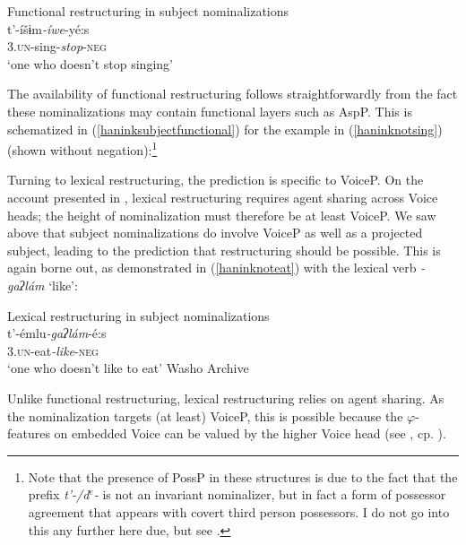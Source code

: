 \documentclass[output=paper]{langscibook}
\begin{document}
\ea Functional restructuring in subject nominalizations\\
{\gll t'-íšɨm\textit{-íwe}-yé:s\\
{\scshape 3.un}-sing-\textit{stop}-{\scshape neg}\\
\glt `one who doesn't stop singing'} \label{haninknotsing}
\z

The availability of functional restructuring follows straightforwardly from the fact these nominalizations may contain functional layers such as AspP. This is schematized in (\ref{haninksubjectfunctional}) for the example in 
(\ref{haninknotsing}) (shown without negation):\footnote{Note that the presence of PossP in these structures is due to the fact that the prefix {\itshape t'-/d$^e$-} is not an invariant nominalizer, but in fact a form of possessor agreement that appears with covert third person possessors. I do not go into this any further here due, but see \citet{hanink2020}.}

\ea \label{haninksubjectfunctional}
 \z 
 
Turning to lexical restructuring, the prediction is specific to VoiceP. On the account presented in , lexical restructuring requires agent sharing across Voice heads; the height of nominalization must therefore be at least VoiceP. We saw above that subject nominalizations do involve VoiceP as well as a projected subject, leading to the prediction that restructuring should be possible. This is again borne out, as demonstrated in (\ref{haninknoteat}) with the lexical verb {\itshape -gaʔlám} `like': 

\ea Lexical restructuring in subject nominalizations\\
\gll t'-émlu\textit{-gaʔlám}-é:s\\
{\scshape 3.un}-eat\textit{-like}-{\scshape neg}\\
\glt `one who doesn't like to eat' \label{haninknoteat}\hfill Washo Archive
\z


Unlike functional restructuring, lexical restructuring relies on agent sharing. As the nominalization targets (at least) VoiceP, this is possible because the $\varphi$-features on embedded Voice can be valued by the higher Voice head (see , cp. ).
\end{document}
